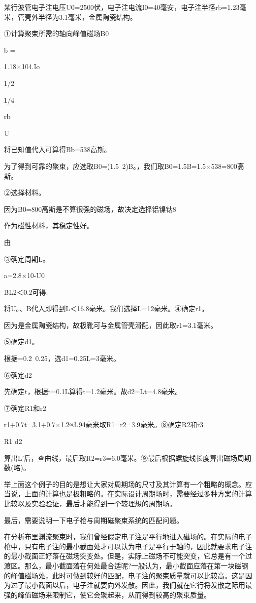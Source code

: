 某行波管电子注电压U0=2500伏，电子注电流I0=40毫安，电子注半径rb=1.23毫米，管壳外半径为3.1毫米，金属陶瓷结构。


①计算聚束所需的轴向峰值磁场B0


b =


1.18×104.Io


1/2


1/4


rb


U


将已知值代入可算得Bb=538高斯。


为了得到可靠的聚束，应选取B0=(1.5~2)B。，我们取B0=1.5B=1.5×538=800高斯。


②选择材料。


因为B0=800高斯是不算很强的磁场，故决定选择铝镍钴8


作为磁性材料，其稳定性好。


由 

③确定周期L。


a=2.8×10-U0


BL2＜0.2可得:



将U。、B代入即得到L＜16.8毫米。我们选择L=12毫米。④确定r1。


因为是金属陶瓷结构，故极靴可与金属管壳滑配，因此取r1=3.1毫米。


⑤确定d1。


根据=0.2~0.25，选d1=0.25L=3毫米。


⑥确定d2


先确定t，根据t=0.1L算得t=1.2毫米。故d2=Lt=4.8毫米。


⑦确定R1和r2


r1+0.7t=3.1+0.7×1.2≈3.94毫米取R1=r2=3.9毫米。⑧确定R2和r3


R1 d2


算出L’后，查曲线，最后取R2=r3=6.0毫米。⑨最后根据螺旋线长度算出磁场周期数(略)。


举上面这个例子的目的是想让大家对周期场的尺寸及其计算有一个粗略的概念。应当说，上面的计算也是极粗略的。在实际设计周期场时，需要经过多种方案的计算比较以及实验验证，最后才能得到一个较理想的周期场。


最后，需要说明一下电子枪与周期磁聚束系统的匹配问题。


在分析布里渊流聚束时，我们曾经假定电子注是平行地进入磁场的。在实际的电子枪中，只有电子注的最小截面处才可以认为电子是平行于轴的，因此就要求电子注的最小截面正好落在磁场突变处。但是，实际上磁场不可能突变，它总是有一个过渡区。那么，最小截面落在何处最合适呢?一般认为，最小截面应落在第一块磁钢的峰值磁场处，此时可做到较好的匹配，电子注的聚束质量就可以比较高。这是因为过了最小截面以后，电子注就要向外发散。因此，我们就在它行将发散之际用最强的峰值磁场来限制它，使它会聚起来，从而得到较高的聚束质量。








